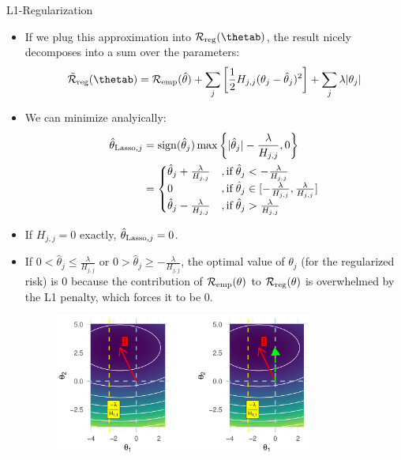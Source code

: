 \begin{vbframe} {L1-Regularization}
  \begin{itemize}
    \item If we plug this approximation into $\mathcal{R}_{\text{reg}}(\thetab)$, the result nicely decomposes into a sum over the parameters:
  $$\mathcal{\tilde R}_{\text{reg}}(\thetab) = \mathcal{R}_{\text{emp}}(\thetah) + \sum_j \left[ \frac{1}{2} H_{j,j} (\theta_j - \hat{\theta}_j)^2 \right] + \sum_j \lambda |\theta_j|$$
    \item We can minimize analyically:
     \begin{align*}\hat{\theta}_{\text{Lasso},j} &= \operatorname{sign}(\hat{\theta}_j) \max \left\{ |\hat{\theta}_j| - \frac{\lambda}{H_{j,j}},0 \right\} \\
     &= \begin{cases} 
     \hat{\theta}_j + \frac{\lambda}{H_{j,j}} &, \text{if}   \;\hat{\theta}_j < -\frac{\lambda}{H_{j,j}} \\
       0 &, \text{if}   \;\hat{\theta}_j \in [-\frac{\lambda}{H_{j,j}}, \frac{\lambda}{H_{j,j}}] \\
     \hat{\theta}_j - \frac{\lambda}{H_{j,j}} &, \text{if}   \;\hat{\theta}_j > \frac{\lambda}{H_{j,j}} \\
     \end{cases}
     \end{align*}
  \item If $H_{j,j} = 0$ exactly, $\hat{\theta}_{\text{Lasso},j} = 0$.

\framebreak

\item If  $0 < \hat{\theta}_j \leq \frac{\lambda}{H_{j,j}}$ or $0 > \hat{\theta}_j \geq -\frac{\lambda}{H_{j,j}}$, the optimal value of $\theta_j$ (for the regularized risk) is $0$ because the contribution of  $\mathcal{R}_{\text{emp}}(\theta)$ to $\mathcal{R}_{\text{reg}}(\theta)$ is overwhelmed by the L1 penalty, which forces it to be $0$.

\begin{figure}
\includegraphics[width=0.8\textwidth]{figure_man/L1-regul01.png}\\
\end{figure}


\end{itemize}
\end{vbframe}
